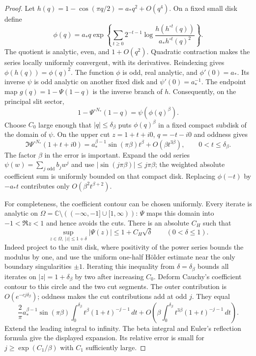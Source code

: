 \begin{proof}
Let $h(q)=1-\cos(\pi q/2)=a_*q^2+O(q^4)$. On a fixed small disk define
\[
 \phi(q)=a_*q\exp\left\{\sum_{t\ge0}2^{-t-1}
 \log\frac{h(h^{\circ t}(q))}{a_*h^{\circ t}(q)^2}\right\}.
\]
The quotient is analytic, even, and $1+O(q^2)$. Quadratic contraction
makes the series locally uniformly convergent, with its derivatives.
Reindexing gives $\phi(h(q))=\phi(q)^2$. The function $\phi$ is odd,
real analytic, and $\phi'(0)=a_*$. Its inverse $\psi$ is odd analytic
on another fixed disk and $\psi'(0)=a_*^{-1}$.
The endpoint map $g(q)=1-\Psi(1-q)$ is the inverse branch of $h$.
Consequently, on the principal slit sector,
\begin{equation}\label{eq:bottcher}
 1-\Psi^{\circ N_*}(1-q)=\psi(\phi(q)^\beta).
\end{equation}
Choose $C_0$ large enough that $|q|\le\delta_\beta$ puts
$\phi(q)^\beta$ in a fixed compact subdisk of the domain of $\psi$.
On the upper cut $z=1+t+i0$, $q=-t-i0$ and oddness gives
\[
 \Im\Psi^{\circ N_*}(1+t+i0)
 =a_*^{\beta-1}\sin(\pi\beta)t^\beta+O(\beta t^{3\beta}),
 \qquad 0<t\le\delta_\beta.
\]
The factor $\beta$ in the error is important. Expand the odd series
$\psi(w)=\sum_{j\text{ odd}}b_jw^j$ and use
$|\sin(j\pi\beta)|\le j\pi\beta$; the weighted absolute coefficient
sum is uniformly bounded on that compact disk. Replacing $\phi(-t)$
by $-a_*t$ contributes only $O(\beta^2t^{\beta+2})$.

For completeness, the coefficient contour can be chosen uniformly.
Every iterate is analytic on
$\Omega=\mathbb C\setminus(( -\infty,-1]\cup[1,\infty))$:
$\Psi$ maps this domain into $-1<\Re z<1$ and hence avoids the cuts.
There is an absolute $C_H$ such that
\[
 \sup_{z\in\Omega,\ |z|\le1+\delta}|\Psi(z)|
       \le1+C_H\sqrt\delta\qquad(0<\delta\le1).
\]
Indeed project to the unit disk, where positivity of the power series
bounds the modulus by one, and use the uniform one-half H\"older
estimate near the only boundary singularities $\pm1$.
Iterating this inequality from $\delta=\delta_\beta$ bounds all iterates
on $|z|=1+\delta_\beta$ by two after increasing $C_0$.
Deform Cauchy's coefficient contour to this circle and the two cut
segments. The outer contribution is $O(e^{-cj\delta_\beta})$;
oddness makes the cut contributions add at odd $j$. They equal
\[
 \frac2\pi a_*^{\beta-1}\sin(\pi\beta)
 \int_0^{\delta_\beta}t^\beta(1+t)^{-j-1}\,dt
 +O\left(\beta\int_0^{\delta_\beta}t^{3\beta}(1+t)^{-j-1}\,dt\right).
\]
Extend the leading integral to infinity. The beta integral and Euler's
reflection formula give the displayed expansion. Its relative error
is small for $j\ge\exp(C_1/\beta)$ with $C_1$ sufficiently large.
\end{proof}


